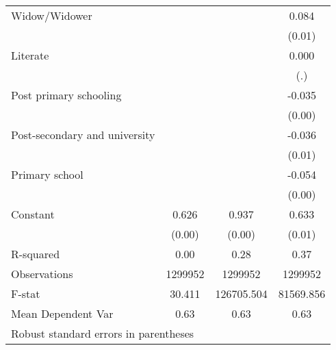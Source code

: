 {\begin{tabular}{l*{3}{c}}
Widow/Widower       &                     &                     &       0.084\sym{***}\\
                    &                     &                     &      (0.01)         \\
Literate            &                     &                     &       0.000         \\
                    &                     &                     &         (.)         \\
Post primary schooling&                     &                     &      -0.035\sym{***}\\
                    &                     &                     &      (0.00)         \\
Post-secondary and university&                     &                     &      -0.036\sym{***}\\
                    &                     &                     &      (0.01)         \\
Primary school      &                     &                     &      -0.054\sym{***}\\
                    &                     &                     &      (0.00)         \\
Constant            &       0.626\sym{***}&       0.937\sym{***}&       0.633\sym{***}\\
                    &      (0.00)         &      (0.00)         &      (0.01)         \\
\hline
R-squared           &        0.00         &        0.28         &        0.37         \\
Observations        &     1299952         &     1299952         &     1299952         \\
F-stat              &      30.411         &  126705.504         &   81569.856         \\
Mean Dependent Var  &        0.63         &        0.63         &        0.63         \\
\hline\hline
\multicolumn{4}{l}{\footnotesize Robust standard errors in parentheses}\\
\end{tabular}
}

